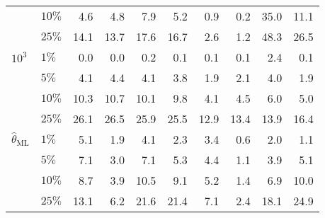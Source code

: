 \documentclass[a4paper,14pt]{extarticle}
\begin{document}
\begin{table}
\begin{tabular}{ll||rrrr|rrrr}
        & $10\%$ &      4.6 &      4.8 &      7.9 &      5.2 &      0.9 &      0.2 &     35.0 &     11.1 \\
        & $25\%$ &     14.1 &     13.7 &     17.6 &     16.7 &      2.6 &      1.2 &     48.3 &     26.5 \\
  \midrule
   $10^3$ & $1\%$ &      0.0 &      0.0 &      0.2 &      0.1 &      0.1 &      0.1 &      2.4 &      0.1 \\
        & $5\%$ &      4.1 &      4.4 &      4.1 &      3.8 &      1.9 &      2.1 &      4.0 &      1.9 \\
        & $10\%$ &     10.3 &     10.7 &     10.1 &      9.8 &      4.1 &      4.5 &      6.0 &      5.0 \\
        & $25\%$ &     26.1 &     26.5 &     25.9 &     25.5 &     12.9 &     13.4 &     13.9 &     16.4 \\
  \midrule
   $\hat{\theta}_\text{ML}$ & $1\%$ &      5.1 &      1.9 &      4.1 &      2.3 &      3.4 &      0.6 &      2.0 &      1.1 \\
        & $5\%$ &      7.1 &      3.0 &      7.1 &      5.3 &      4.4 &      1.1 &      3.9 &      5.1 \\
        & $10\%$ &      8.7 &      3.9 &     10.5 &      9.1 &      5.2 &      1.4 &      6.9 &     10.0 \\
        & $25\%$ &     13.1 &      6.2 &     21.6 &     21.4 &      7.1 &      2.4 &     18.1 &     24.9 \\
  \bottomrule
  \end{tabular}
\end{table}
\end{document}
